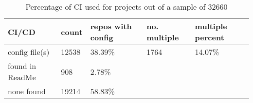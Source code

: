 
    \begin{table}[h]
\begin{tabular}{|l|l|l|l|l|}
\hline
    CI/CD & \textbf{count} & \textbf{repos with config} & \textbf{no. multiple} & \textbf{multiple percent}   \\ \hline
config file(s) &           12538     & 38.39\%                                & 1764          & 14.07\%             \\ \hline
found in ReadMe & 908     & 2.78\%                                &             &             \\ \hline
none found &            19214     & 58.83\%                                &             &             \\ \hline
\end{tabular}
\caption[Percentage of CI used for projects]{Percentage of CI used for projects out of a sample of 32660 }
\label{table_ci_usage}
\end{table}
    